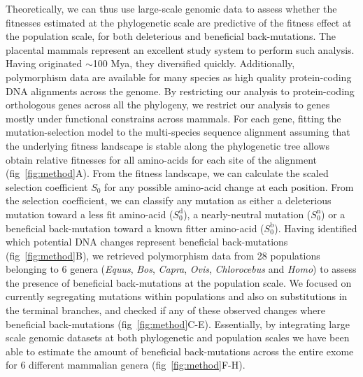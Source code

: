 \documentclass{article}
\newcommand{\Sphy}{S_{0}}
\begin{document}
    Theoretically, we can thus use large-scale genomic data to assess whether the fitnesses estimated at the phylogenetic scale are predictive of the fitness effect at the population scale, for both deleterious and beneficial back-mutations.
    The placental mammals represent an excellent study system to perform such analysis.
    Having originated $\sim$100 Mya\cite{kumar_timetree_2017}, they diversified quickly.
    Additionally, polymorphism data are available for many species\cite{howe_ensembl_2021} as high quality protein-coding DNA alignments across the genome\cite{ranwez_orthomam_2007, scornavacca_orthomam_2019}.
    By restricting our analysis to protein-coding orthologous genes across all the phylogeny, we restrict our analysis to genes mostly under functional constrains across mammals.
    For each gene, fitting the mutation-selection model to the multi-species sequence alignment assuming that the underlying fitness landscape is stable along the phylogenetic tree allows obtain relative fitnesses for all amino-acids for each site of the alignment (fig~\ref{fig:method}A).
    From the fitness landscape, we can calculate the scaled selection coefficient $\Sphy$ for any possible amino-acid change at each position.
    From the selection coefficient, we can classify any mutation as either a deleterious mutation toward a less fit amino-acid ($\Sphy^{\text{d}}$), a nearly-neutral mutation ($\Sphy^{\text{n}}$) or a beneficial back-mutation toward a known fitter amino-acid ($\Sphy^{\text{b}}$).
    Having identified which potential DNA changes represent beneficial back-mutations (fig~\ref{fig:method}B), we retrieved polymorphism data from 28 populations belonging to 6 genera (\textit{Equus}, \textit{Bos}, \textit{Capra}, \textit{Ovis}, \textit{Chlorocebus} and \textit{Homo}) to assess the presence of beneficial back-mutations at the population scale.
    We focused on currently segregating mutations within populations and also on substitutions in the terminal branches, and checked if any of these observed changes where beneficial back-mutations (fig~\ref{fig:method}C-E).
    Essentially, by integrating large scale genomic datasets at both phylogenetic and population scales we have been able to estimate the amount of beneficial back-mutations across the entire exome for 6 different mammalian genera (fig~\ref{fig:method}F-H).
\end{document}
